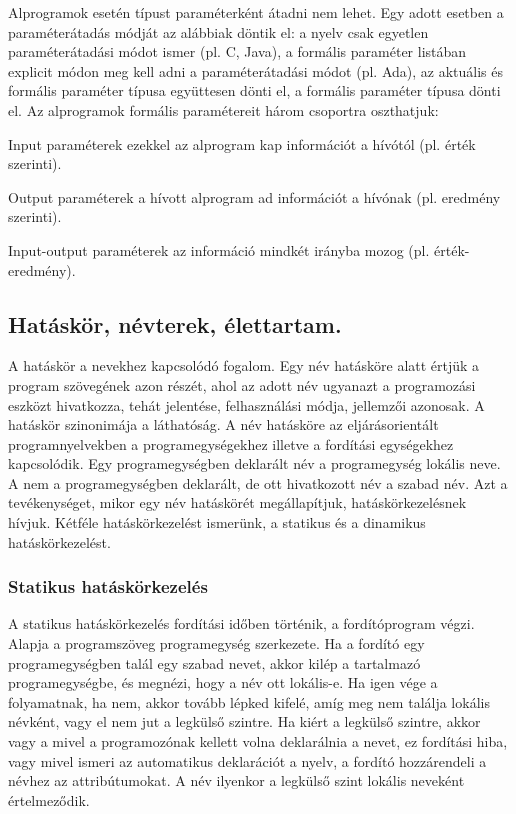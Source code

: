 Alprogramok esetén típust paraméterként átadni nem lehet. Egy adott esetben a paraméterátadás módját az alábbiak döntik el: a nyelv csak egyetlen paraméterátadási módot ismer (pl. C, Java), a formális paraméter listában explicit módon meg kell adni a paraméterátadási módot (pl. Ada), az aktuális és formális paraméter típusa együttesen dönti el, a formális paraméter típusa dönti el.
Az alprogramok formális paramétereit három csoportra oszthatjuk:
\begin{enumdescript}[noitemsep]
	\item[Input paraméterek] ezekkel az alprogram kap információt a hívótól (pl. érték szerinti).
	\item[Output paraméterek] a hívott alprogram ad információt a hívónak (pl. eredmény szerinti).
	\item[Input-output paraméterek] az információ mindkét irányba mozog (pl. érték-eredmény).
\end{enumdescript}

\subsection{Hatáskör, névterek, élettartam. }
A hatáskör a nevekhez kapcsolódó fogalom. Egy név hatásköre alatt értjük a program szövegének azon részét, ahol az adott név ugyanazt a programozási eszközt hivatkozza, tehát jelentése, felhasználási módja, jellemzői azonosak. A hatáskör szinonimája a láthatóság. A név hatásköre az eljárásorientált programnyelvekben a programegységekhez illetve a fordítási egységekhez kapcsolódik. Egy programegységben deklarált név a programegység lokális neve. A nem a programegységben deklarált, de ott hivatkozott név a szabad név. Azt a tevékenységet, mikor egy név hatáskörét megállapítjuk, hatáskörkezelésnek hívjuk. Kétféle hatáskörkezelést ismerünk, a statikus és a dinamikus hatáskörkezelést.

\subsubsection{Statikus hatáskörkezelés}
A statikus hatáskörkezelés fordítási időben történik, a fordítóprogram végzi. Alapja a programszöveg programegység szerkezete. Ha a fordító egy programegységben talál egy szabad nevet, akkor kilép a tartalmazó programegységbe, és megnézi, hogy a név ott lokális-e. Ha igen vége a folyamatnak, ha nem, akkor tovább lépked kifelé, amíg meg nem találja lokális névként, vagy el nem jut a legkülső szintre. Ha kiért a legkülső szintre, akkor vagy a mivel a programozónak kellett volna deklarálnia a nevet, ez fordítási hiba, vagy mivel ismeri az automatikus deklarációt a nyelv, a fordító hozzárendeli a névhez az attribútumokat. A név ilyenkor a legkülső szint lokális neveként értelmeződik.

